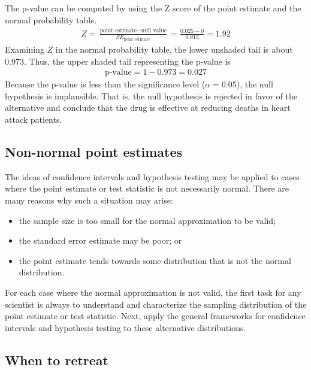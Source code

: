 \begin{example}
The p-value can be computed by using the Z score of the point estimate and the normal probability table.
\begin{eqnarray}
Z = \frac{\text{point estimate} - \text{null value}}{SE_{\text{point estimate}}}
	= \frac{0.025 - 0}{0.013} = 1.92
\label{zScoreOfPointEstimateForSulphinpyrazoneThisIsFirstTestStatReference}
\end{eqnarray}
Examining $Z$ in the normal probability table, the lower unshaded tail is about 0.973. Thus, the upper shaded tail representing the p-value is
\begin{eqnarray*}
\text{p-value} = 1-0.973 = 0.027
\end{eqnarray*}
Because the p-value is less than the significance level ($\alpha=0.05$), the null hypothesis is implausible. That is, the null hypothesis is rejected in favor of the alternative and conclude that the drug is effective at reducing deaths in heart attack patients.
\end{example}

\subsection{Non-normal point estimates}

The ideas of confidence intervals and hypothesis testing may be applied to cases where the point estimate or test statistic is not necessarily normal. There are many reasons why such a situation may arise:
\begin{itemize}
\setlength{\itemsep}{0mm}
\item the sample size is too small for the normal approximation to be valid;
\item the standard error estimate may be poor; or
\item the point estimate tends towards some distribution that is not the normal distribution.
\end{itemize}
For each case where the normal approximation is not valid, the first task for any scientist is always to understand and characterize the sampling distribution of the point estimate or test statistic. Next, apply the general frameworks for confidence intervals and hypothesis testing to these alternative distributions.


\subsection{When to retreat}
\label{whenToRetreat}

